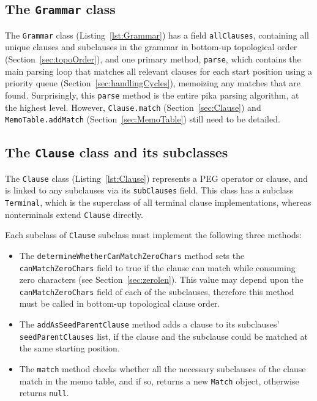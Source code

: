 \documentclass[manuscript,screen]{acmart}
\begin{document}
\subsection{\label{sec:Grammar}The \texttt{Grammar} class}

The \texttt{Grammar} class (Listing~\ref{lst:Grammar}) has a field \texttt{allClauses}, containing all unique clauses and subclauses in the grammar in bottom-up topological order (Section~\ref{sec:topoOrder}), and one primary method, \texttt{parse}, which contains the main parsing loop that matches all relevant clauses for each start position using a priority queue (Section~\ref{sec:handlingCycles}), memoizing any matches that are found. Surprisingly, this \texttt{parse} method is the entire pika parsing algorithm, at the highest level. However, \texttt{Clause.match} (Section~\ref{sec:Clause}) and \texttt{MemoTable.addMatch} (Section~\ref{sec:MemoTable}) still need to be detailed.

\subsection{\label{sec:Clause}The \texttt{Clause} class and its subclasses}

The \texttt{Clause} class (Listing~\ref{lst:Clause}) represents a PEG operator or clause, and is linked to any subclauses via its \texttt{subClauses} field. This class has a subclass \texttt{Terminal}, which is the superclass of all terminal clause implementations, whereas nonterminals extend \texttt{Clause} directly.

Each subclass of \texttt{Clause} subclass must implement the following three methods:

\begin{itemize}
    \item The \texttt{determineWhetherCanMatchZeroChars} method sets the \texttt{canMatchZeroChars} field to true if the clause can match while consuming zero characters (see Section~\ref{sec:zerolen}). This value may depend upon the \texttt{canMatchZeroChars} field of each of the subclauses, therefore this method must be called in bottom-up topological clause order.
    \item The \texttt{addAsSeedParentClause} method adds a clause to its subclauses' \texttt{seedParentClauses} list, if the clause and the subclause could be matched at the same starting position.
    \item The \texttt{match} method checks whether all the necessary subclauses of the clause match in the memo table, and if so, returns a new \texttt{Match} object, otherwise returns \texttt{null}.
\end{itemize}
\end{document}
